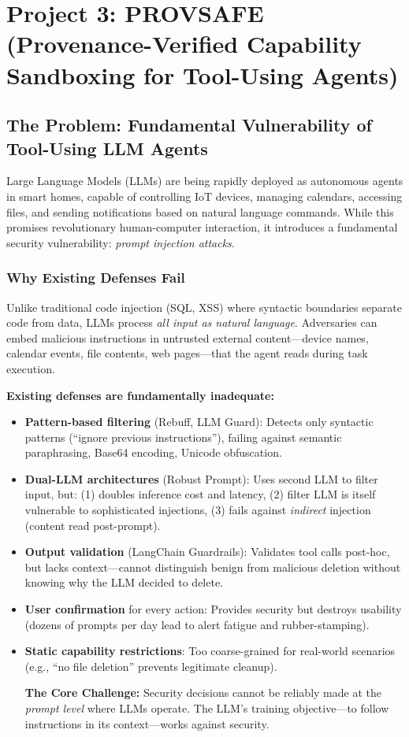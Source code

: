 
\section{Project 3: PROVSAFE (Provenance-Verified Capability Sandboxing for Tool-Using Agents)}

\subsection{The Problem: Fundamental Vulnerability of Tool-Using LLM Agents}

Large Language Models (LLMs) are being rapidly deployed as autonomous agents in smart homes, capable of controlling IoT devices, managing calendars, accessing files, and sending notifications based on natural language commands. While this promises revolutionary human-computer interaction, it introduces a fundamental security vulnerability: \emph{prompt injection attacks}.

\subsubsection{Why Existing Defenses Fail}

Unlike traditional code injection (SQL, XSS) where syntactic boundaries separate code from data, LLMs process \emph{all input as natural language}. Adversaries can embed malicious instructions in untrusted external content---device names, calendar events, file contents, web pages---that the agent reads during task execution.

\textbf{Existing defenses are fundamentally inadequate:}
\begin{itemize}[leftmargin=1.2em]
  \item \textbf{Pattern-based filtering} (Rebuff, LLM Guard): Detects only syntactic patterns (``ignore previous instructions''), failing against semantic paraphrasing, Base64 encoding, Unicode obfuscation.
  \item \textbf{Dual-LLM architectures} (Robust Prompt): Uses second LLM to filter input, but: (1) doubles inference cost and latency, (2) filter LLM is itself vulnerable to sophisticated injections, (3) fails against \emph{indirect} injection (content read post-prompt).
  \item \textbf{Output validation} (LangChain Guardrails): Validates tool calls post-hoc, but lacks context---cannot distinguish benign from malicious deletion without knowing why the LLM decided to delete.
  \item \textbf{User confirmation} for every action: Provides security but destroys usability (dozens of prompts per day lead to alert fatigue and rubber-stamping).
  \item \textbf{Static capability restrictions}: Too coarse-grained for real-world scenarios (e.g., ``no file deletion'' prevents legitimate cleanup).

\textbf{The Core Challenge:} Security decisions cannot be reliably made at the \emph{prompt level} where LLMs operate. The LLM's training objective---to follow instructions in its context---works against security.
\end{itemize}

